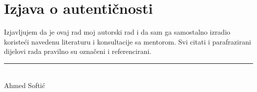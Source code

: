 \thispagestyle{empty}

\vspace*{8cm}

\section*{Izjava o autentičnosti}

Izjavljujem da je ovaj rad moj autorski rad i da sam ga samostalno izradio koristeći navedenu literaturu i konsultacije sa mentorom. Svi citati i parafrazirani dijelovi rada pravilno su označeni i referencirani.

\vspace{3cm}

\hfill\begin{minipage}{6cm}
\centering
\rule{6cm}{0.4pt}\\
Ahmed Softić
\end{minipage}
